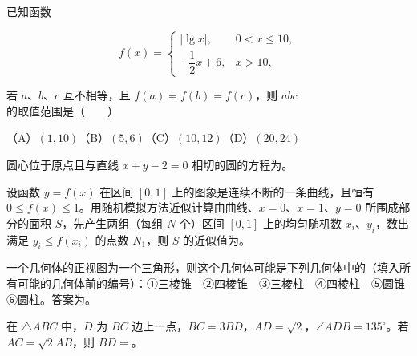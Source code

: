 \begin{question}
已知函数

\nopagebreak[4]
\[
f(x)=\begin{cases}|\lg x|,&0<x\leq10,\\-\dfrac12x+6,&x>10,\end{cases}
\]

若 $a\text{、}b\text{、}c$ 互不相等，且 $f(a)=f(b)=f(c)$，则 $abc$ 的取值范围是\mbox{（　　）}

（A）$(1,10)$\quad（B）$(5,6)$\quad（C）$(10,12)$\quad（D）$(20,24)$

\end{question}

\begin{question}
圆心位于原点且与直线 $x+y-2=0$ 相切的圆的方程为\gkblank{}。

\end{question}
\begin{question}
设函数 $y=f(x)$ 在区间 $[0,1]$ 上的图象是连续不断的一条曲线，且恒有 $0\leq f(x)\leq1$。用随机模拟方法近似计算由曲线、$x=0$、$x=1$、$y=0$ 所围成部分的面积 $S$，先产生两组（每组 $N$ 个）区间 $[0,1]$ 上的均匀随机数 $x_i\text{、}y_i$，数出满足 $y_i\leq f(x_i)$ 的点数 $N_1$，则 $S$ 的近似值为\gkblank{}。

\end{question}
\begin{question}
一个几何体的正视图为一个三角形，则这个几何体可能是下列几何体中的（填入所有可能的几何体前的编号）：①三棱锥　②四棱锥　③三棱柱　④四棱柱　⑤圆锥　⑥圆柱。答案为\gkblank{}。

\end{question}
\begin{question}
在 $\triangle ABC$ 中，$D$ 为 $BC$ 边上一点，$BC=3BD$，$AD=\sqrt2$，$\angle ADB=135^\circ$。若 $AC=\sqrt2 AB$，则 $BD=$\gkblank{}。

\end{question}

